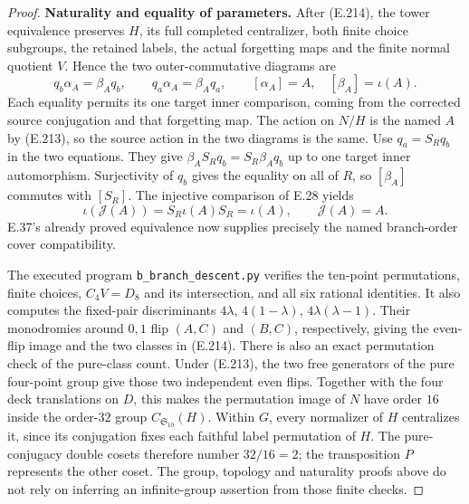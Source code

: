 \begin{proof}
\par\medskip\noindent\textbf{Naturality and equality of parameters.}\quad
After (E.214), the tower equivalence preserves $H$, its full
completed centralizer, both finite choice subgroups, the
retained labels, the actual forgetting maps and the finite
normal quotient $V$.  Hence the two outer-commutative diagrams
are
\[
 q_b\alpha_A=\beta_Aq_b,\qquad
 q_a\alpha_A=\beta_Aq_a,\qquad
 [\alpha_A]=A,\quad[\beta_A]=\iota(A).
                                                               \tag{E.218}
\]
Each equality permits its one target inner comparison, coming
from the corrected source conjugation and that forgetting map.
The action on $N/H$ is the named $A$ by (E.213), so the source
action in the two diagrams is the same.
Use $q_a=S_Rq_b$ in the two equations.
They give $\beta_AS_Rq_b=S_R\beta_Aq_b$ up to one target inner
automorphism.  Surjectivity of $q_b$ gives the equality on all
of $R$, so $[\beta_A]$ commutes with $[S_R]$.
The injective comparison of E.28 yields
\[
 \iota(\mathcal J(A))=S_R\iota(A)S_R=\iota(A),
                  \qquad \mathcal J(A)=A.
                                                               \tag{E.219}
\]
E.37's already proved equivalence now supplies precisely the
named branch-order cover compatibility.

The executed program \texttt{b\_branch\_descent.py} verifies the
ten-point permutations, finite choices, $C_4V=D_8$ and its
intersection, and all six rational identities.
It also computes the fixed-pair discriminants
$4\lambda$, $4(1-\lambda)$, $4\lambda(\lambda-1)$.
Their monodromies around $0,1$ flip $(A,C)$ and $(B,C)$,
respectively, giving the even-flip image and the two classes
in (E.214).
There is also an exact permutation check of the pure-class
count.  Under (E.213), the two free generators of the pure
four-point group give those two independent even flips.
Together with the four deck translations on $D$, this makes
the permutation image of $N$ have order $16$ inside the
order-$32$ group $C_{\mathfrak S_{10}}(H)$.
Within $G$, every normalizer of $H$ centralizes it, since
its conjugation fixes each faithful label permutation of $H$.
The pure-conjugacy double cosets therefore number $32/16=2$;
the transposition $P$ represents the other coset.
The group, topology and naturality proofs above do not rely
on inferring an infinite-group assertion from those finite checks.
\end{proof}

